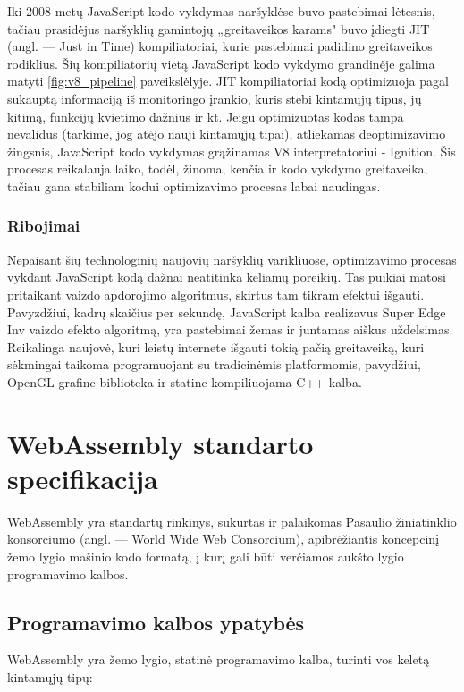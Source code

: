 \documentclass{VUMIFPSkursinis}
\begin{document}
Iki 2008 metų JavaScript kodo vykdymas naršyklėse buvo pastebimai lėtesnis, tačiau prasidėjus naršyklių gamintojų „greitaveikos karams" buvo įdiegti JIT (angl. — Just in Time) kompiliatoriai, kurie pastebimai padidino greitaveikos rodiklius. \cite{Cal17} Šių kompiliatorių vietą JavaScript kodo vykdymo grandinėje galima matyti \ref{fig:v8_pipeline} paveikslėlyje.
JIT kompiliatoriai kodą optimizuoja pagal sukauptą informaciją iš monitoringo įrankio, kuris stebi kintamųjų tipus, jų kitimą, funkcijų kvietimo dažnius ir kt. Jeigu optimizuotas kodas tampa nevalidus (tarkime, jog atėjo nauji kintamųjų tipai), atliekamas deoptimizavimo žingsnis, JavaScript kodo vykdymas grąžinamas V8 interpretatoriui - Ignition. Šis procesas reikalauja laiko, todėl, žinoma, kenčia ir kodo vykdymo greitaveika, tačiau gana stabiliam kodui optimizavimo procesas labai naudingas.
\subsubsection{Ribojimai}
Nepaisant šių technologinių naujovių naršyklių varikliuose, optimizavimo procesas vykdant JavaScript kodą dažnai neatitinka keliamų poreikių. Tas puikiai matosi pritaikant vaizdo apdorojimo algoritmus, skirtus tam tikram efektui išgauti. Pavyzdžiui, kadrų skaičius per sekundę, JavaScript kalba realizavus Super Edge Inv vaizdo efekto algoritmą, yra pastebimai žemas ir juntamas aiškus uždelsimas. \cite{WVE17} Reikalinga naujovė, kuri leistų internete išgauti tokią pačią greitaveiką, kuri sėkmingai taikoma programuojant su tradicinėmis platformomis, pavydžiui, OpenGL grafine biblioteka ir statine kompiliuojama C++ kalba.

\section{WebAssembly standarto specifikacija}

WebAssembly yra standartų rinkinys, sukurtas ir palaikomas Pasaulio žiniatinklio konsorciumo (angl. — World Wide Web Consorcium), apibrėžiantis koncepcinį žemo lygio mašinio kodo formatą, į kurį gali būti verčiamos aukšto lygio programavimo kalbos. \cite{WAS17}

\subsection{Programavimo kalbos ypatybės}
WebAssembly yra žemo lygio, statinė programavimo kalba, turinti vos keletą kintamųjų tipų:
\end{document}
